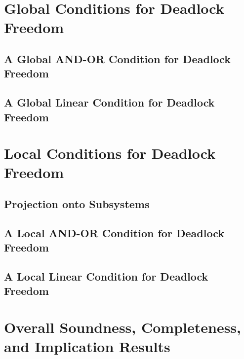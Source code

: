 \documentclass[prodmode,acmtosem]{acmsmall} %
\begin{document}
\section{Global Conditions for Deadlock Freedom}
\label{s:global}

   \subsection{A Global AND-OR Condition for Deadlock Freedom}
   \label{s:global.ANDOR}
   

   \subsection{A Global Linear Condition for Deadlock Freedom}
   \label{s:globCondition}
   \label{s:global.Linear}
   


\section{Local Conditions for Deadlock Freedom}
\label{s:local}

   \label{s:local.preamble}
   

   \subsection{Projection onto Subsystems}
   \label{s:projection}
   

   \subsection{A Local AND-OR Condition for Deadlock Freedom}
   \label{s:ANDORcond}
   

   \subsection{A Local Linear Condition for Deadlock Freedom}
   \label{s:condition}
   



\section{Overall Soundness, Completeness, and Implication Results}
\end{document}
